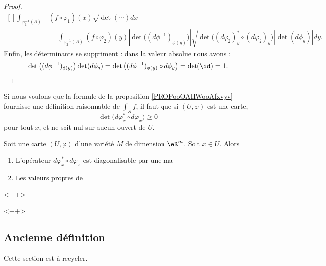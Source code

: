 \begin{proof}
\begin{equation}
        \begin{aligned}[]
        \int_{\varphi_1^{-1}(A)}&(f\circ\varphi_1)(x)\sqrt{ \det(\cdots) }dx\\
        &=\int_{\varphi^{-1}_2(A)}(f\circ\varphi_2)(y)| \det\big( (d\phi^{-1})_{\phi(y)} \big) |\sqrt{ \det\big( (d\varphi_2)_y^*\circ(d\varphi_2)_y \big) }| \det(d\phi_y) |dy.
        \end{aligned}
    \end{equation}
    Enfin, les déterminants se suppriment : dans la valeur absolue nous avons :
    \begin{equation}
        \det\big( (d\phi^{-1})_{\phi(y)} \big)\det(d\phi_y)=\det\big( (d\phi^{-1})_{\phi(y)}\circ d\phi_y \big)=\det(\id)=1.
    \end{equation}
\end{proof}

Si nous voulons que la formule de la proposition \ref{PROPooOAHWooAfxvyv} fournisse une définition raisonnable de \( \int_Af\), il faut que si \( (U,\varphi)\) est une carte,
\begin{equation}
    \det\big( d\varphi_x^*\circ d\varphi_x \big)\geq 0
\end{equation}
pour tout \( x\), et ne soit nul sur aucun ouvert de \( U\).

\begin{lemma}
    Soit une carte \( (U,\varphi)\) d'une variété \( M\) de dimension \( \eR^m\). Soit \( x\in U\). Alors
    \begin{enumerate}
        \item
            L'opérateur \( d\varphi_x^*\circ d\varphi_x\) est diagonalisable par une ma
        \item
            Les valeurs propres de 
    \end{enumerate}
    <++>
\end{lemma}
<++>

\subsection{Ancienne définition}

Cette section est à recycler.

